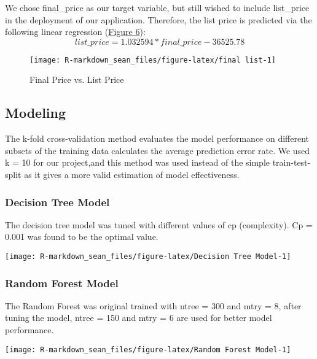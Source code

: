\documentclass[11pt,]{article}
\begin{document}
We chose final\_price as our target variable, but still wished to
include list\_price in the deployment of our application. Therefore, the
list price is predicted via the following linear regression
(\hyperref[sec:fig6]{Figure 6}):
\[list\_price = 1.032594 * final\_price - 36525.78\]

\begin{figure}

{\centering \texttt{[image: R-markdown\_sean\_files/figure-latex/final list-1]} 

}

\caption{Final Price vs. List Price\label{sec:fig6}}\label{fig:final list}
\end{figure}
\newpage

\hypertarget{modeling-1}{%
\subsection{Modeling}\label{modeling-1}}

The k-fold cross-validation method evaluates the model performance on
different subsets of the training data calculates the average prediction
error rate. We used k = 10 for our project,and this method was used
instead of the simple train-test-split as it gives a more valid
estimation of model effectiveness.

\hypertarget{decision-tree-model}{%
\subsubsection{Decision Tree Model}\label{decision-tree-model}}

The decision tree model was tuned with different values of cp
(complexity). Cp = 0.001 was found to be the optimal value.

\begin{center}\texttt{[image: R-markdown\_sean\_files/figure-latex/Decision Tree Model-1]} \end{center}

\hypertarget{random-forest-model}{%
\subsubsection{Random Forest Model}\label{random-forest-model}}

The Random Forest was original trained with ntree = 300 and mtry = 8,
after tuning the model, ntree = 150 and mtry = 6 are used for better
model performance.

\begin{center}\texttt{[image: R-markdown\_sean\_files/figure-latex/Random Forest Model-1]} \end{center}
\end{document}
